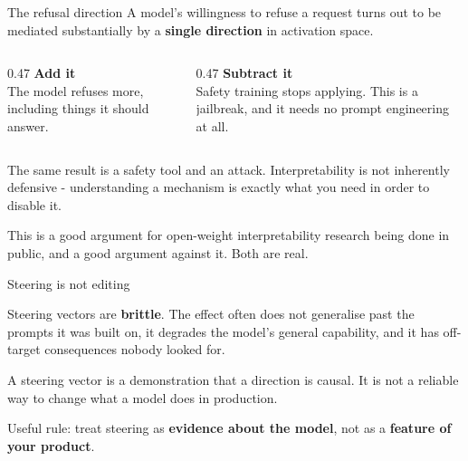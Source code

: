 \documentclass[aspectratio=169]{beamer}
\newcommand{\trapbox}[1]{%
  \begin{tcolorbox}[colback=armred!8, colframe=armred, boxrule=0.6pt, arc=2pt]
  #1
  \end{tcolorbox}}
\newcommand{\takebox}[1]{%
  \begin{tcolorbox}[colback=paramgreen!8, colframe=paramgreen, boxrule=0.6pt, arc=2pt]
  #1
  \end{tcolorbox}}
\newcommand{\watchbox}[1]{%
  \begin{tcolorbox}[colback=armorange!12, colframe=armorange, boxrule=0.6pt, arc=2pt]
  #1
  \end{tcolorbox}}
\begin{document}
\begin{frame}{The refusal direction}
  \vspace{0.8em}
  A model's willingness to refuse a request turns out to be mediated substantially by a
  \textbf{single direction} in activation space.

  \vspace{0.8em}
  \begin{columns}[T]
    \begin{column}{0.47\textwidth}
      \textbf{Add it}\\[0.3em]
      \small The model refuses more, including things it should answer.
    \end{column}
    \begin{column}{0.47\textwidth}
      \textbf{Subtract it}\\[0.3em]
      \small Safety training stops applying. This is a jailbreak, and it needs no prompt
      engineering at all.
    \end{column}
  \end{columns}

  \vspace{1.0em}
  \trapbox{The same result is a safety tool and an attack. Interpretability is not inherently
  defensive - understanding a mechanism is exactly what you need in order to disable it.}

  \vspace{0.6em}
  {\footnotesize This is a good argument for open-weight interpretability research being done in
  public, and a good argument against it. Both are real.}
\end{frame}

\begin{frame}{Steering is not editing}
  \vspace{1.0em}
  \watchbox{Steering vectors are \textbf{brittle}. The effect often does not generalise past the
  prompts it was built on, it degrades the model's general capability, and it has off-target
  consequences nobody looked for.}

  \vspace{1.0em}
  A steering vector is a demonstration that a direction is causal. It is not a reliable way to
  change what a model does in production.

  \vspace{1.0em}
  \takebox{Useful rule: treat steering as \textbf{evidence about the model}, not as a
  \textbf{feature of your product}.}
\end{frame}
\end{document}
